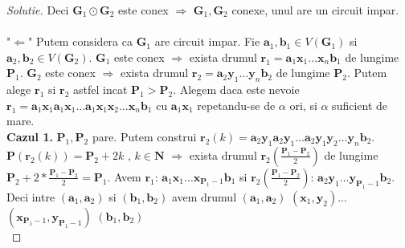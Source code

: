 \documentclass[12pt]{article}
\begin{document}
\begin{proof}[Solutie]
Deci \(\mathbf{G}_{1}\odot{\mathbf{G}_{2}}\) este conex \(\Rightarrow\) \(\mathbf{G}_{1}, \mathbf{G}_{2}\) conexe, unul are un circuit impar.\\\\
"\(\Longleftarrow\)" Putem considera ca \(\mathbf{G}_{1}\) are circuit impar. Fie \(\mathbf{a}_{1}, \mathbf{b}_{1}\in{V(\mathbf{G}_{1})}\) si \(\mathbf{a}_{2}, \mathbf{b}_{2}\in{V(\mathbf{G}_{2})}\). \(\mathbf{G}_{1}\) este conex \(\Rightarrow\) exista drumul \(\mathbf{r}_{1} = \mathbf{a}_{1}\mathbf{x}_{1} \ldots \mathbf{x}_{n}\mathbf{b}_{1}\) de lungime \(\mathbf{P}_{1}\). \(\mathbf{G}_{2}\) este conex \(\Rightarrow\) exista drumul \(\mathbf{r}_{2} = \mathbf{a}_{2}\mathbf{y}_{1} \ldots \mathbf{y}_{n}\mathbf{b}_{2}\) de lungime \(\mathbf{P}_{2}\). Putem alege \(\mathbf{r}_{1}\) si \(\mathbf{r}_{2}\) astfel incat \(\mathbf{P}_{1} > \mathbf{P}_{2}\). Alegem daca este nevoie \(\mathbf{r}_{1} = \mathbf{a}_{1}\mathbf{x}_{1} \mathbf{a}_{1}\mathbf{x}_{1}\ldots \mathbf{a}_{1}\mathbf{x}_{1}\mathbf{x}_{2}\ldots\mathbf{x}_{n}\mathbf{b}_{1}\) cu \(\mathbf{a}_{1}\mathbf{x}_{1}\) repetandu-se de \(\alpha\) ori, si \(\alpha\) suficient de mare.\\

\textbf{Cazul 1.} \(\mathbf{P}_{1}, \mathbf{P}_{2}\) pare. Putem construi \(\mathbf{r}_{2}(k)=\mathbf{a}_{2}\mathbf{y}_{1} \mathbf{a}_{2}\mathbf{y}_{1}\ldots \mathbf{a}_{2}\mathbf{y}_{1}\mathbf{y}_{2}\ldots\mathbf{y}_{n}\mathbf{b}_{2}\). \(\mathbf{P}(\mathbf{r}_{2}(k))=\mathbf{P}_{2} + 2k\) , \(k\in{\textbf{N}}\)
\(\Rightarrow\) exista drumul \(\mathbf{r}_{2}(\frac{\mathbf{P}_{1}-\mathbf{P}_{2}}{2})\) de lungime \(\mathbf{P}_{2}+2*\frac{\mathbf{P}_{1}-\mathbf{P}_{2}}{2} = \mathbf{P}_{1}\). Avem \(\mathbf{r}_{1}\): \(\mathbf{a}_{1}\mathbf{x}_{1} \ldots \mathbf{x}_{\mathbf{P}_{1}-1}\mathbf{b}_{1}\) si \(\mathbf{r}_{2}(\frac{\mathbf{P}_{1}-\mathbf{P}_{2}}{2})\): \(\mathbf{a}_{2}\mathbf{y}_{1} \ldots \mathbf{y}_{\mathbf{P}_{1}-1}\mathbf{b}_{2}\). Deci intre \((\mathbf{a}_{1}, \mathbf{a}_{2})\) si \((\mathbf{b}_{1}, \mathbf{b}_{2})\) avem drumul \((\mathbf{a}_{1}, \mathbf{a}_{2})\) \((\mathbf{x}_{1}, \mathbf{y}_{2})\)...\((\mathbf{x}_{\mathbf{P}_{1}-1}, \mathbf{y}_{\mathbf{P}_{1}-1})\) \((\mathbf{b}_{1}, \mathbf{b}_{2})\)\\


\end{proof}
\end{document}
